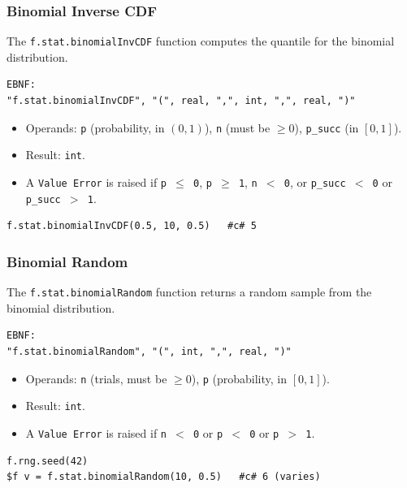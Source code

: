 \subsubsection{Binomial Inverse CDF}
The \texttt{f.stat.binomialInvCDF} function computes the quantile for the binomial distribution.
\begin{verbatim}
EBNF:
"f.stat.binomialInvCDF", "(", real, ",", int, ",", real, ")"
\end{verbatim}
\begin{itemize}
\item Operands: \texttt{p} (probability, in $(0, 1)$), \texttt{n} (must be $\geq 0$), \texttt{p\_succ} (in $[0, 1]$).
\item Result: \texttt{int}.
\item A \texttt{Value Error} is raised if \texttt{p $\leq$ 0}, \texttt{p $\geq$ 1}, \texttt{n $<$ 0}, or \texttt{p\_succ $<$ 0} or \texttt{p\_succ $>$ 1}.
\end{itemize}
\begin{verbatim}
f.stat.binomialInvCDF(0.5, 10, 0.5)   #c# 5
\end{verbatim}

\subsubsection{Binomial Random}
The \texttt{f.stat.binomialRandom} function returns a random sample from the binomial distribution.
\begin{verbatim}
EBNF:
"f.stat.binomialRandom", "(", int, ",", real, ")"
\end{verbatim}
\begin{itemize}
\item Operands: \texttt{n} (trials, must be $\geq 0$), \texttt{p} (probability, in $[0, 1]$).
\item Result: \texttt{int}.
\item A \texttt{Value Error} is raised if \texttt{n $<$ 0} or \texttt{p $<$ 0} or \texttt{p $>$ 1}.
\end{itemize}
\begin{verbatim}
f.rng.seed(42)
$f v = f.stat.binomialRandom(10, 0.5)   #c# 6 (varies)
\end{verbatim}

